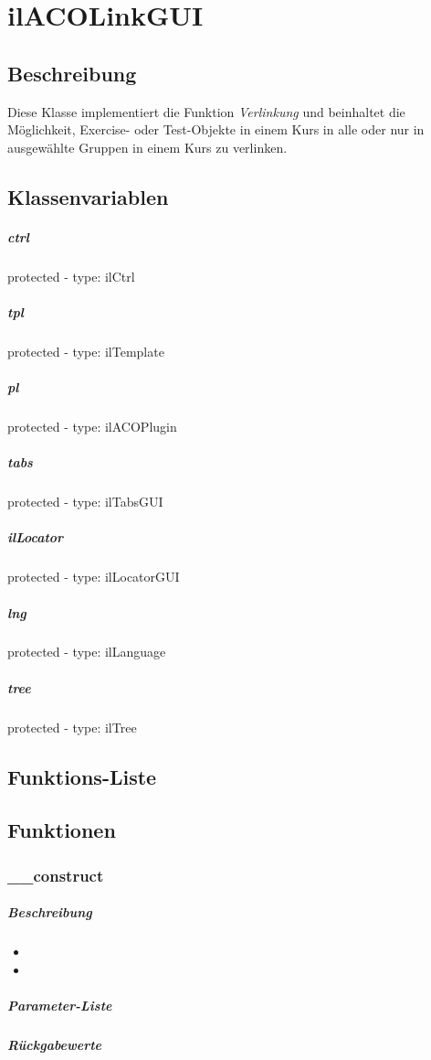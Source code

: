 \section{ilACOLinkGUI}

\subsection*{Beschreibung}
Diese Klasse implementiert die Funktion \textit{Verlinkung} und beinhaltet die Möglichkeit, Exercise- oder Test-Objekte in einem Kurs in alle oder nur in ausgewählte Gruppen in einem Kurs zu verlinken.

\subsection*{Klassenvariablen}
\subparagraph{ctrl}
protected - type: ilCtrl
\subparagraph{tpl}
protected - type: ilTemplate
\subparagraph{pl}
protected - type: ilACOPlugin
\subparagraph{tabs}
protected - type: ilTabsGUI
\subparagraph{ilLocator}
protected - type: ilLocatorGUI
\subparagraph{lng}
protected - type: ilLanguage
\subparagraph{tree}
protected - type: ilTree

\subsection*{Funktions-Liste}
\subparagraph{}
\subparagraph{}
\subparagraph{}
\subparagraph{}
\subparagraph{}
\subparagraph{}
\subparagraph{}
\subparagraph{}
\subparagraph{}
\subparagraph{}
\subparagraph{}
\subparagraph{}
\subparagraph{}
\subparagraph{}
\subparagraph{}

\subsection*{Funktionen}
\subsubsection*{\_\_construct}\label{constructLGUI}
\subparagraph{Beschreibung}
\begin{itemize}
	\item[] \noindent{} 
	\item[] 
\end{itemize}
\subparagraph{Parameter-Liste}
\subparagraph{Rückgabewerte}

